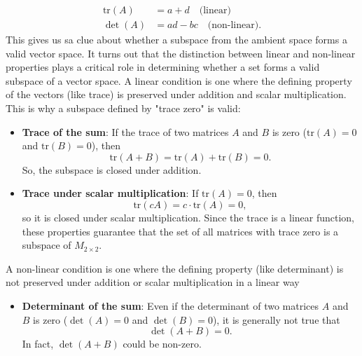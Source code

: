 \documentclass{report}
\begin{document}
\begin{itemize}
            \begin{align*}
                \text{tr}(A) &= a + d \quad \text{(linear)} \\
                \det(A) &= ad - bc \quad \text{(non-linear)}
            .\end{align*}
            \bigbreak \noindent 
             This gives us sa clue about whether a subspace from the ambient space forms a valid vector space. It turns out that the distinction between linear and non-linear properties plays a critical role in determining whether a set forms a valid subspace of a vector space.
             \bigbreak \noindent 
             A linear condition is one where the defining property of the vectors (like trace) is preserved under addition and scalar multiplication. This is why a subspace defined by "trace zero" is valid:
             \begin{itemize}
                 \item \textbf{Trace of the sum}: If the trace of two matrices \( A \) and \( B \) is zero 
                 (\( \text{tr}(A) = 0 \) and \( \text{tr}(B) = 0 \)), then 
                 \[
                     \text{tr}(A + B) = \text{tr}(A) + \text{tr}(B) = 0.
                 \]
                 So, the subspace is closed under addition.
                 \bigbreak \noindent 
                 \item \textbf{Trace under scalar multiplication}: If \( \text{tr}(A) = 0 \), then 
                 \[
                     \text{tr}(cA) = c \cdot \text{tr}(A) = 0,
                 \]
                 so it is closed under scalar multiplication.
                 \bigbreak \noindent 
                 Since the trace is a linear function, these properties guarantee that the set of all matrices with trace zero is a subspace of \( M_{2 \times 2} \).
             \end{itemize}
             \bigbreak \noindent 
             A non-linear condition is one where the defining property (like determinant) is not preserved under addition or scalar multiplication in a linear way
             \begin{itemize}
                 \item \textbf{Determinant of the sum}: Even if the determinant of two matrices \( A \) and \( B \) is zero 
                 (\( \det(A) = 0 \) and \( \det(B) = 0 \)), it is generally not true that 
                 \[
                     \det(A + B) = 0.
                 \]
                 In fact, \( \det(A + B) \) could be non-zero.
                 \bigbreak \noindent 

\end{itemize}
\end{itemize}
\end{document}
